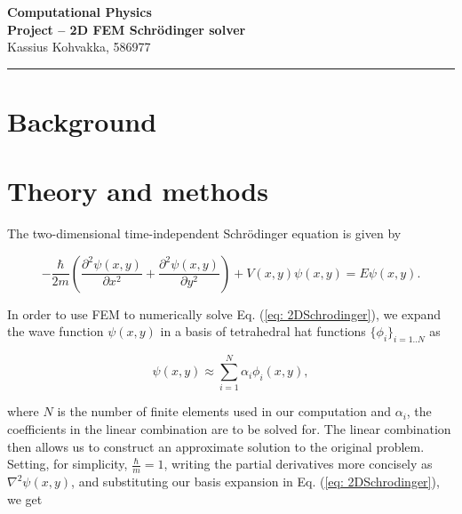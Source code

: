 \documentclass[a4paper,12pt]{article}
\newcommand{\exerline}{
\vspace*{.1cm}
\noindent \rule{\textwidth}{1pt}
\vspace*{.1cm}
}
\begin{document}
\begin{minipage}[t][1.5cm][b]{\textwidth}
\begin{center}
\Large{\textbf{Computational Physics}} \\
\vspace*{.1cm}
\Large{\textbf{Project -- 2D FEM Schrödinger solver}}\\
\vspace*{.1cm}
\large{Kassius Kohvakka, 586977}
\end{center}
\end{minipage} 
\vspace{-0.4cm}

\exerline

\section{Background}

\section{Theory and methods}

The two-dimensional time-independent Schrödinger equation is given by

\begin{equation}
\label{eq: 2DSchrodinger}
-\frac{\hbar}{2m} \left( \frac{\partial^2 \psi (x,y)}{\partial x^2} + \frac{\partial^2 \psi (x,y)}{\partial y^2} \right) + V(x,y)\psi (x,y) = E \psi (x,y) .
\end{equation}

In order to use FEM to numerically solve Eq. (\ref{eq: 2DSchrodinger}), we expand the wave function $\psi (x,y)$ in a basis of tetrahedral hat functions $\lbrace \phi_i \rbrace_{i=1..N}$ as

\begin{equation}
\label{eq: basisExpansion}
\psi (x,y) \approx \sum_{i=1}^{N} \alpha_i \phi_i(x,y),
\end{equation}

where $N$ is the number of finite elements used in our computation and $\alpha_i$, the coefficients in the linear combination are to be solved for. The linear combination then allows us to construct an approximate solution to the original problem. Setting, for simplicity, $\frac{\hbar}{m} = 1$, writing the partial derivatives more concisely as $\nabla^2 \psi(x,y)$, and substituting our basis expansion in Eq. (\ref{eq: 2DSchrodinger}), we get 
\end{document}
